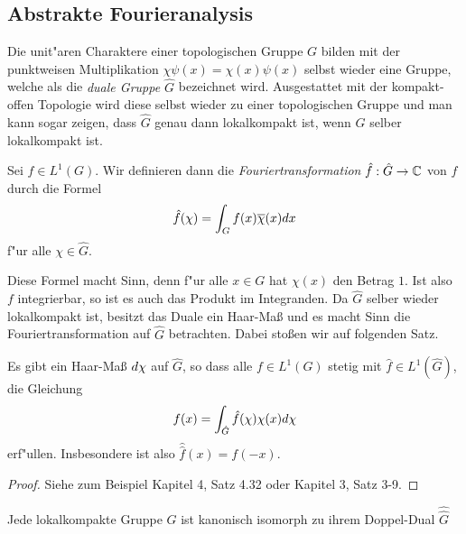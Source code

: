 \subsection{Abstrakte Fourieranalysis}
	 Die unit"aren Charaktere einer topologischen Gruppe $G$ bilden mit der punktweisen Multiplikation $\chi\psi (x) = \chi(x) \psi (x)$ selbst wieder eine Gruppe, welche als die \emph{duale Gruppe $\hat{G}$} bezeichnet wird.
	Ausgestattet mit der kompakt-offen Topologie wird diese selbst wieder zu einer topologischen Gruppe und man kann sogar zeigen, dass $\hat{G}$ genau dann lokalkompakt ist, wenn $G$ selber lokalkompakt ist.
	\begin{defi}[Fouriertransformation]
		Sei $f\in L^1(G)$. Wir definieren dann die \emph{Fouriertransformation} $\hat{f}: \hat{G} \to \C$ von $f$ durch die Formel
		\begin{align*}
			\hat{f}(\chi) = \int_G f(x)\conj{\chi}(x) dx
		\end{align*}
		f"ur alle $\chi \in \hat{G}$.
	\end{defi}
	Diese Formel macht Sinn, denn f"ur alle $x \in G$ hat $\chi(x)$ den Betrag $1$. 
	Ist also $f$ integrierbar, so ist es auch das Produkt im Integranden.
	Da $\hat{G}$ selber wieder lokalkompakt ist, besitzt das Duale ein Haar-Maß und es macht Sinn die Fouriertransformation auf $\hat{G}$ betrachten.
	Dabei stoßen wir auf folgenden Satz.
	\begin{satz}
		Es gibt ein Haar-Maß $\dx[\chi]$ auf $\hat{G}$, so dass alle $f \in L^1(G)$ stetig mit $\hat{f} \in L^1(\hat{G})$, die Gleichung
		\begin{align*}
			f(x) = \int_{\hat{G}} \hat{f}(\chi) \chi(x) \dx[\chi]
		\end{align*}
		erf"ullen. Insbesondere ist also $\hat{\hat{f}}(x) = f(-x)$.
	\end{satz}
	\begin{proof}
		Siehe zum Beispiel \cite{folland} Kapitel 4, Satz 4.32 oder \cite{rama} Kapitel 3, Satz 3-9.
	\end{proof}

	\begin{satz}
		Jede lokalkompakte Gruppe $G$ ist kanonisch isomorph zu ihrem Doppel-Dual $\hat{\hat{G}}$ 
	\end{satz}
	
